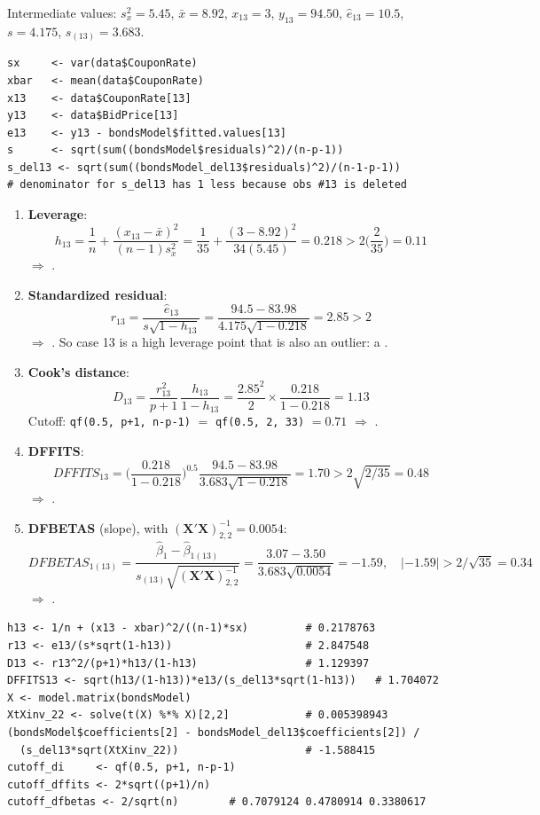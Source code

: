 \begin{example}
    Intermediate values: $s_x^2=5.45$, $\bar x=8.92$, $x_{13}=3$, $y_{13}=94.50$,
    $\hat e_{13}=10.5$, $s=4.175$, $s_{(13)}=3.683$.
\begin{verbatim}
sx     <- var(data$CouponRate)
xbar   <- mean(data$CouponRate)
x13    <- data$CouponRate[13]
y13    <- data$BidPrice[13]
e13    <- y13 - bondsModel$fitted.values[13]
s      <- sqrt(sum((bondsModel$residuals)^2)/(n-p-1))
s_del13 <- sqrt(sum((bondsModel_del13$residuals)^2)/(n-1-p-1))
# denominator for s_del13 has 1 less because obs #13 is deleted
\end{verbatim}
    \begin{enumerate}
        \item \textbf{Leverage}:
        \[h_{13}=\frac1n+\frac{(x_{13}-\bar x)^2}{(n-1)s_x^2}=\frac1{35}+\frac{(3-8.92)^2}{34(5.45)}=0.218>2\Big(\frac{2}{35}\Big)=0.11\]
        $\Rightarrow$ .
        \item \textbf{Standardized residual}:
        \[r_{13}=\frac{\hat e_{13}}{s\sqrt{1-h_{13}}}=\frac{94.5-83.98}{4.175\sqrt{1-0.218}}=2.85>2\]
        $\Rightarrow$ . So case 13 is a high leverage point that is also an outlier:
        a .
        \item \textbf{Cook's distance}:
        \[D_{13}=\frac{r_{13}^2}{p+1}\,\frac{h_{13}}{1-h_{13}}=\frac{2.85^2}{2}\times\frac{0.218}{1-0.218}=1.13\]
        Cutoff: \texttt{qf(0.5, p+1, n-p-1)} $=$ \texttt{qf(0.5, 2, 33)} $=0.71$
         $\Rightarrow$ .
        \item \textbf{DFFITS}:
        \[DFFITS_{13}=\Big(\frac{0.218}{1-0.218}\Big)^{0.5}\frac{94.5-83.98}{3.683\sqrt{1-0.218}}=1.70>2\sqrt{2/35}=0.48\]
        $\Rightarrow$ .
        \item \textbf{DFBETAS} (slope), with $(\mathbf{X}'\mathbf{X})^{-1}_{2,2}=0.0054$:
        \[DFBETAS_{1(13)}=\frac{\hat\beta_1-\hat\beta_{1(13)}}{s_{(13)}\sqrt{(\mathbf{X}'\mathbf{X})^{-1}_{2,2}}}=\frac{3.07-3.50}{3.683\sqrt{0.0054}}=-1.59,\quad|{-1.59}|>2/\sqrt{35}=0.34\]
        $\Rightarrow$  .
    \end{enumerate}
\begin{verbatim}
h13 <- 1/n + (x13 - xbar)^2/((n-1)*sx)         # 0.2178763
r13 <- e13/(s*sqrt(1-h13))                     # 2.847548
D13 <- r13^2/(p+1)*h13/(1-h13)                 # 1.129397
DFFITS13 <- sqrt(h13/(1-h13))*e13/(s_del13*sqrt(1-h13))   # 1.704072
X <- model.matrix(bondsModel)
XtXinv_22 <- solve(t(X) %*% X)[2,2]            # 0.005398943
(bondsModel$coefficients[2] - bondsModel_del13$coefficients[2]) /
  (s_del13*sqrt(XtXinv_22))                    # -1.588415
cutoff_di     <- qf(0.5, p+1, n-p-1)
cutoff_dffits <- 2*sqrt((p+1)/n)
cutoff_dfbetas <- 2/sqrt(n)        # 0.7079124 0.4780914 0.3380617
\end{verbatim}
\end{example}

